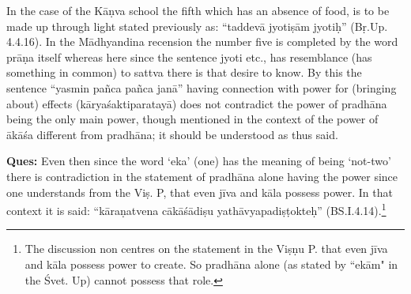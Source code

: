 \vskip -2pt

\textbf{}

\vskip -2pt


\vskip -2pt


\vskip -2pt

In the case of the Kāṇva school the fifth which has an absence of food, is to be made up through light stated previously as: “taddevā jyotiṣām jyotiḥ” (Bṛ.Up. 4.4.16). In the Mādhyandina recension the number five is completed by the word prāṇa itself whereas here since the sentence jyoti etc., has resemblance (has something in common) to sattva there is that desire to know. By this the sentence “yasmin pañca pañca janā” having connection with power for (bringing about) effects (kāryaśaktiparatayā) does not contradict the power of pradhāna being the only main power, though mentioned in the context of the power of ākāśa different from pradhāna; it should be understood as thus said.

\textbf{Ques:} Even then since the word ‘eka’ (one) has the meaning of being ‘not-two’ there is contradiction in the statement of pradhāna alone having the power since one understands from the Viṣ. P, that even jīva and kāla possess power. In that context it is said: “kāraṇatvena cākāśādiṣu yathāvyapadiṣṭokteḥ” (BS.I.4.14).\footnote{The discussion non centres on the statement in the Viṣṇu P. that even jīva and kāla possess power to create. So pradhāna alone (as stated by ``ekām" in the Śvet. Up) cannot possess that role.}

\textbf{}


